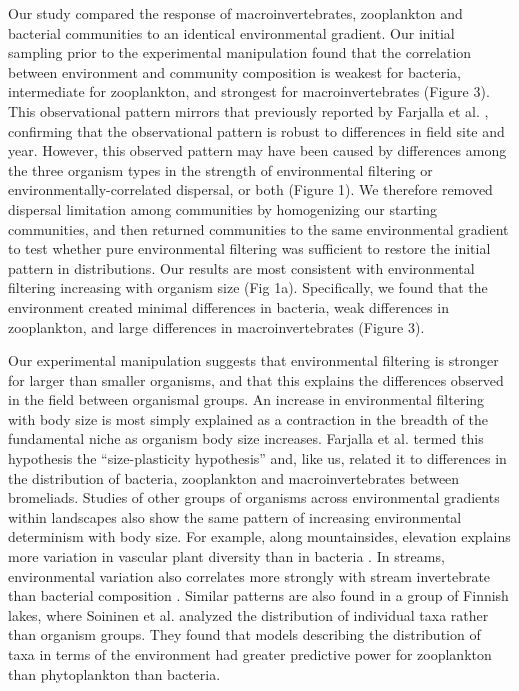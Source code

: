 Our study compared the response of macroinvertebrates, zooplankton and
bacterial communities to an identical environmental gradient. Our
initial sampling prior to the experimental manipulation found that the
correlation between environment and community composition is weakest for
bacteria, intermediate for zooplankton, and strongest for
macroinvertebrates (Figure 3). This observational pattern mirrors that
previously reported by Farjalla et al. \citeyearpar{Farjalla2012},
confirming that the observational pattern is robust to differences in
field site and year. However, this observed pattern may have been caused
by differences among the three organism types in the strength of
environmental filtering or environmentally-correlated dispersal, or both
(Figure 1). We therefore removed dispersal limitation among communities
by homogenizing our starting communities, and then returned communities
to the same environmental gradient to test whether pure environmental
filtering was sufficient to restore the initial pattern in
distributions. Our results are most consistent with environmental
filtering increasing with organism size (Fig 1a). Specifically, we found
that the environment created minimal differences in bacteria, weak
differences in zooplankton, and large differences in macroinvertebrates
(Figure 3).

Our experimental manipulation suggests that environmental filtering is
stronger for larger than smaller organisms, and that this explains the
differences observed in the field between organismal groups. An increase
in environmental filtering with body size is most simply explained as a
contraction in the breadth of the fundamental niche as organism body
size increases. Farjalla et al. \citeyearpar{Farjalla2012} termed this
hypothesis the ``size-plasticity hypothesis'' and, like us, related it
to differences in the distribution of bacteria, zooplankton and
macroinvertebrates between bromeliads. Studies of other groups of
organisms across environmental gradients within landscapes also show the
same pattern of increasing environmental determinism with body size. For
example, along mountainsides, elevation explains more variation in
vascular plant diversity than in bacteria \citep{Bryant2008}. In
streams, environmental variation also correlates more strongly with
stream invertebrate than bacterial composition \citep{Wang2012b}.
Similar patterns are also found in a group of Finnish lakes, where
Soininen et al. \citeyearpar{Soininen2013} analyzed the distribution of
individual taxa rather than organism groups. They found that models
describing the distribution of taxa in terms of the environment had
greater predictive power for zooplankton than phytoplankton than
bacteria.

